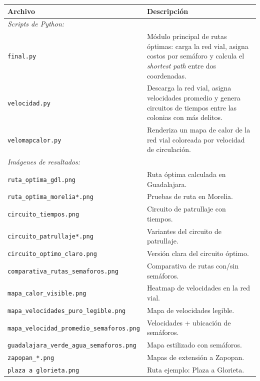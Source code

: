 \documentclass[12pt, a4paper]{article}
\begin{document}
\begin{table}[h!]
\centering
\small
\begin{tabular}{p{6.5cm} p{7.5cm}}
\toprule
\textbf{Archivo} & \textbf{Descripción} \\
\midrule
\multicolumn{2}{l}{\textit{Scripts de Python:}} \\
\addlinespace
\texttt{final.py} & Módulo principal de rutas óptimas: carga la red vial, asigna costos por semáforo y calcula el \textit{shortest path} entre dos coordenadas. \\
\texttt{velocidad.py} & Descarga la red vial, asigna velocidades promedio y genera circuitos de tiempos entre las colonias con más delitos. \\
\texttt{velomapcalor.py} & Renderiza un mapa de calor de la red vial coloreada por velocidad de circulación. \\
\midrule
\multicolumn{2}{l}{\textit{Imágenes de resultados:}} \\
\addlinespace
\texttt{ruta\_optima\_gdl.png} & Ruta óptima calculada en Guadalajara. \\
\texttt{ruta\_optima\_morelia*.png} & Pruebas de ruta en Morelia. \\
\texttt{circuito\_tiempos.png} & Circuito de patrullaje con tiempos. \\
\texttt{circuito\_patrullaje*.png} & Variantes del circuito de patrullaje. \\
\texttt{circuito\_optimo\_claro.png} & Versión clara del circuito óptimo. \\
\texttt{comparativa\_rutas\_semaforos.png} & Comparativa de rutas con/sin semáforos. \\
\texttt{mapa\_calor\_visible.png} & Heatmap de velocidades en la red vial. \\
\texttt{mapa\_velocidades\_puro\_legible.png} & Mapa de velocidades legible. \\
\texttt{mapa\_velocidad\_promedio\_semaforos.png} & Velocidades + ubicación de semáforos. \\
\texttt{guadalajara\_verde\_agua\_semaforos.png} & Mapa estilizado con semáforos. \\
\texttt{zapopan\_*.png} & Mapas de extensión a Zapopan. \\
\texttt{plaza a glorieta.png} & Ruta ejemplo: Plaza a Glorieta. \\
\bottomrule
\end{tabular}
\end{table}

\end{document}

